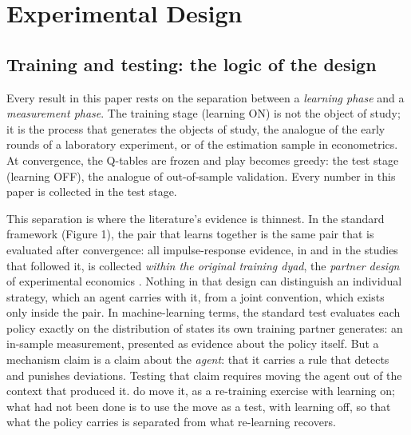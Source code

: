 \documentclass[sigconf]{acmart}
\begin{document}
\section{Experimental Design}\label{experimental-design}

\subsection{Training and testing: the logic of the
design}\label{training-and-testing-the-logic-of-the-design}

Every result in this paper rests on the separation between a
\emph{learning phase} and a \emph{measurement phase}. The training stage
(learning ON) is not the object of study; it is the process that
generates the objects of study, the analogue of the early rounds of a
laboratory experiment, or of the estimation sample in econometrics. At
convergence, the Q-tables are frozen and play becomes greedy: the test
stage (learning OFF), the analogue of out-of-sample validation. Every
number in this paper is collected in the test stage.

This separation is where the literature's evidence is thinnest. In the
standard framework (Figure 1), the pair that learns together is the same
pair that is evaluated after convergence: all impulse-response evidence,
in \citet{calvano2020} and in the studies that followed it, is collected
\emph{within the original training dyad}, the \emph{partner design} of
experimental economics \citep{andreoni1988}. Nothing in that design can
distinguish an individual strategy, which an agent carries with it, from
a joint convention, which exists only inside the pair. In
machine-learning terms, the standard test evaluates each policy exactly
on the distribution of states its own training partner generates: an
in-sample measurement, presented as evidence about the policy itself.
But a mechanism claim is a claim about the \emph{agent}: that it carries
a rule that detects and punishes deviations. Testing that claim requires
moving the agent out of the context that produced it. \citet[Section
VI.B]{calvano2020} do move it, as a re-training exercise with learning
on; what had not been done is to use the move as a test, with learning
off, so that what the policy carries is separated from what re-learning
recovers.
\end{document}
